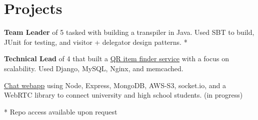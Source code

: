 \documentclass[]{hieudo-build}
\begin{document}
\begin{minipage}[t]{0.65\textwidth}


\section{Projects}
\descript{}
{\bf Team Leader} of 5 tasked with building a transpiler in Java. Used SBT to build, JUnit for testing, and visitor + delegator design patterns. *
\sectionsep

\descript{}
{\bf Technical Lead} of 4 that built a \href{https://github.com/JasonYao/Large-Scale-Final-Project-Lost-and-Found-Recovery-Service}{QR item finder service} with a focus on scalability. Used Django, MySQL, Nginx, and memcached.
\sectionsep

\descript{}
\href{https://github.com/JasonYao/university-video-meeter}{Chat webapp} using Node, Express, MongoDB, AWS-S3, socket.io, and a  WebRTC library to connect university and high school students. (in progress)\\
\sectionsep

* Repo access available upon request
\end{minipage}
\end{document}
